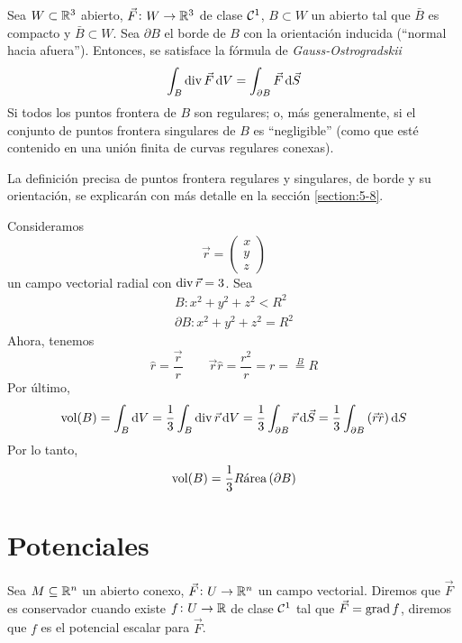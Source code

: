 \begin{teo}
    Sea $W \subset \mathbb{R}^3$ abierto, $\vec{F} \colon W \to \mathbb{R}^3$ de clase $\mathcal{C}^1$, $B \subset W$ un abierto tal que $\bar{B}$ es compacto y $\bar{B} \subset W$.
    Sea $\partial B$ el borde de $B$ con la orientación inducida (``normal hacia afuera''). Entonces, se satisface la fórmula de \emph{Gauss-Ostrogradskii}
    \[
        \int_B \diver \vec{F} \dif V = \int_{\partial B} \vec{F} \dif \vec{S}
    \]
    Si todos los puntos frontera de $B$ son regulares; o, más generalmente, si el conjunto de puntos frontera singulares de $B$ es ``negligible'' (como que est\'e 
    contenido en una unión finita de curvas regulares conexas).
\end{teo}

\begin{obs}
    La definición precisa de puntos frontera regulares y singulares, de borde y su orientación, se explicarán con más detalle en la sección \ref{section:5-8}.
\end{obs}

\begin{example*}
    Consideramos
    \[
        \vec{r} =
        \begin{pmatrix}
            x \\ y \\ z
        \end{pmatrix}
    \]
    un campo vectorial radial con $\operatorname{div} \vec{r} = 3$. Sea
    \begin{gather*}
        B : x^2  + y^2 + z^2 < R^2 \\
        \partial B : x^2 + y^2 + z^2 = R^2
    \end{gather*}
    Ahora, tenemos
    \[
        \hat{r} = \frac{\vec{r}}{r} \qquad
        \vec{r} \hat{r} = \frac{r^2}{r} = r = \stackrel{B}{=} R
    \]
    Por último,
    \[
        \vol(B) = \int_B \dif V = \frac{1}{3} \int_B \diver \vec{r} \dif V = \frac{1}{3} \int_{\partial B} \vec{r} \dif \vec{S}
        = \frac{1}{3} \int_{\partial B} \left( \vec{r} \hat{r} \right) \dif S
    \]
    Por lo tanto,
    \[
        \operatorname{vol}(B) = \frac{1}{3} R \text{área}\left( \partial B \right)
    \]
\end{example*}

\section{Potenciales}

\begin{defi}
    Sea $M \subseteq \mathbb{R}^n$ un abierto conexo, $\vec{F} \colon U \to \mathbb{R}^n$ un campo vectorial. Diremos que $\vec{F}$ es conservador
    cuando existe $f \colon U \to \mathbb{R}$ de clase $\mathcal{C}^1$ tal que $\vec{F} = \operatorname{grad} f$, diremos que $f$ es el potencial escalar para $\vec{F}$.
\end{defi}

